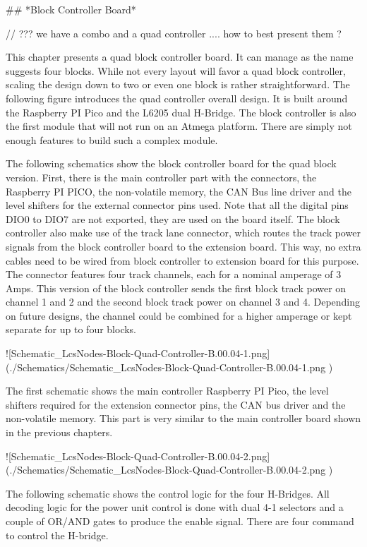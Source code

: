 ## *Block Controller Board*


// ??? we have a combo and a quad controller .... how to best present them ?

This chapter presents a quad block controller board. It can manage as the name suggests four blocks. While not every layout will favor a quad block controller, scaling the design down to two or even one block is rather straightforward. The following figure introduces the quad controller overall design. It is built around the Raspberry PI Pico and the L6205 dual H-Bridge. The block controller is also the first module that will not run on an Atmega platform. There are simply not enough features to build such a complex module.

The following schematics show the block controller board for the quad block version. First, there is the main controller part with the connectors, the Raspberry PI PICO, the non-volatile memory, the CAN Bus line driver and the level shifters for the external connector pins used. Note that all the digital pins DIO0 to DIO7 are not exported, they are used on the board itself. The block controller also make use of the track lane connector, which routes the track power signals from the block controller board to the extension board. This way, no extra cables need to be wired from block controller to extension board for this purpose. The connector features four track channels, each for a nominal amperage of 3 Amps. This version of the block controller sends the first block track power on channel 1 and 2 and the second block track power on channel 3 and 4. Depending on future designs, the channel could be combined for a higher amperage or kept separate for up to four blocks.

![Schematic_LcsNodes-Block-Quad-Controller-B.00.04-1.png](./Schematics/Schematic_LcsNodes-Block-Quad-Controller-B.00.04-1.png )

The first schematic shows the main controller Raspberry PI Pico, the level shifters required for the extension connector pins, the CAN bus driver and the non-volatile memory. This part is very similar to the main controller board shown in the previous chapters.

![Schematic_LcsNodes-Block-Quad-Controller-B.00.04-2.png](./Schematics/Schematic_LcsNodes-Block-Quad-Controller-B.00.04-2.png )

The following schematic shows the control logic for the four H-Bridges. All decoding logic for the power unit control is done with dual 4-1 selectors and a couple of OR/AND gates to produce the enable signal. There are four command to control the H-bridge.

